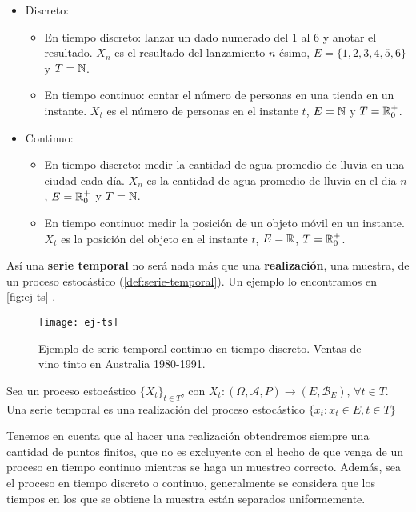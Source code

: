 \begin{itemize}
  \item Discreto:
    \begin{itemize}
      \item En tiempo discreto: lanzar un dado numerado del 1 al 6 y anotar el resultado. $X_n$ es el resultado del lanzamiento $n$-ésimo, $E = \{1, 2, 3, 4, 5, 6\}$ y $T = \mathbb{N}$.
      \item En tiempo continuo: contar el número de personas en una tienda en un instante. $X_t$ es el número de personas en el instante $t$, $E = \mathbb{N}$ y $T = \mathbb{R}^+_0$.
    \end{itemize}
  \item Continuo:
    \begin{itemize}
      \item En tiempo discreto: medir la cantidad de agua promedio de lluvia en una ciudad cada día. $X_n$ es la cantidad de agua promedio de lluvia en el dia $n$, $E = \mathbb{R}^+_0$ y $T = \mathbb{N}$.
      \item En tiempo continuo: medir la posición de un objeto móvil en un instante. $X_t$ es la posición del objeto en el instante $t$, $E = \mathbb{R}$, $T = \mathbb{R}^+_0$.
    \end{itemize}
\end{itemize}

Así una \textbf{serie temporal} no será nada más que una \textbf{realización}, una muestra, de un proceso estocástico (\autoref{def:serie-temporal}). Un ejemplo lo encontramos en \autoref{fig:ej-ts} \cite{brockwell2002introduction}.

\begin{figure}[htpb]
  \centering
  \texttt{[image: ej-ts]}
  \caption{Ejemplo de serie temporal continuo en tiempo discreto. Ventas de vino tinto en Australia 1980-1991.}
  \label{fig:ej-ts}
\end{figure}

\begin{definicion}
  Sea un proceso estocástico $\{X_t\}_{t \in T}$, con $X_t : (\Omega, \mathcal{A}, P) \to (E, \mathcal{B}_E), \, \forall t \in T$. Una serie temporal es una realización del proceso estocástico $\{x_t : x_t \in E, t \in T \}$
  \label{def:serie-temporal}
\end{definicion}

Tenemos en cuenta que al hacer una realización obtendremos siempre una cantidad de puntos finitos, que no es excluyente con el hecho de que venga de un proceso en tiempo continuo mientras se haga un muestreo correcto. Además, sea el proceso en tiempo discreto o continuo, generalmente se considera que los tiempos en los que se obtiene la muestra están separados uniformemente.

